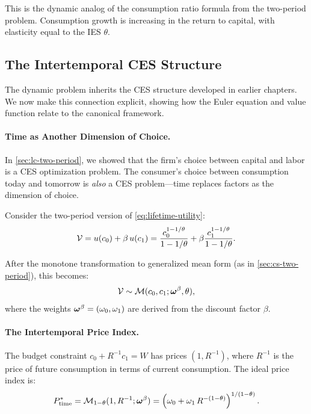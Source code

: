 This is the dynamic analog of the consumption ratio formula from the two-period problem. Consumption growth is increasing in the return to capital, with elasticity equal to the IES $\theta$.

\subsection{The Intertemporal CES Structure}
\label{subsec:intertemporal-ces}

The dynamic problem inherits the CES structure developed in earlier chapters. We now make this connection explicit, showing how the Euler equation and value function relate to the canonical framework.

\paragraph{Time as Another Dimension of Choice.}
In \cref{sec:lc-two-period}, we showed that the firm's choice between capital and labor is a CES optimization problem. The consumer's choice between consumption today and tomorrow is \emph{also} a CES problem---time replaces factors as the dimension of choice.

Consider the two-period version of \cref{eq:lifetime-utility}:
\begin{equation}
\mathcal{V} = u(c_0) + \beta \, u(c_1) = \frac{c_0^{1-1/\theta}}{1-1/\theta} + \beta \frac{c_1^{1-1/\theta}}{1-1/\theta}.
\label{eq:two-period-utility}
\end{equation}

After the monotone transformation to generalized mean form (as in \cref{sec:cs-two-period}), this becomes:
\begin{equation}
\mathcal{V} \sim \mathcal{M}(c_0, c_1; \boldsymbol{\omega}^\beta, \theta),
\label{eq:utility-as-mean}
\end{equation}
where the weights $\boldsymbol{\omega}^\beta = (\omega_0, \omega_1)$ are derived from the discount factor $\beta$.

\paragraph{The Intertemporal Price Index.}
The budget constraint $c_0 + R^{-1} c_1 = W$ has prices $(1, R^{-1})$, where $R^{-1}$ is the price of future consumption in terms of current consumption. The ideal price index is:
\begin{equation}
P^{*}_{\text{time}} = \mathcal{M}_{1-\theta}(1, R^{-1}; \boldsymbol{\omega}^\beta) = \left( \omega_0 + \omega_1 \, R^{-(1-\theta)} \right)^{1/(1-\theta)}.
\label{eq:intertemporal-price-index}
\end{equation}

